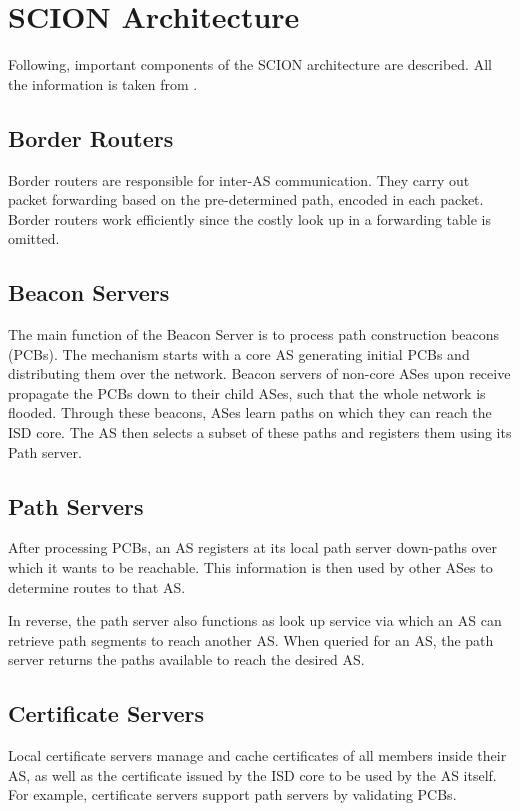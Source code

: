 \section{SCION Architecture}

Following, important components of the SCION architecture are described. All the information is taken from \cite{scion_book}.
 
\subsection{Border Routers}
Border routers are responsible for inter-AS communication. They carry out packet forwarding based on the pre-determined path, encoded in each packet. Border routers work efficiently since the costly look up in a forwarding table is omitted.

\subsection{Beacon Servers}
The main function of the Beacon Server is to process path construction beacons (PCBs). The mechanism starts with a core AS generating initial PCBs and distributing them over the network. Beacon servers of non-core ASes upon receive propagate the PCBs down to their child ASes, such that the whole network is flooded. Through these beacons, ASes learn paths on which they can reach the ISD core. The AS then selects a subset of these paths and registers them using its Path server.

\subsection{Path Servers}
After processing PCBs, an AS registers at its local path server down-paths over which it wants to be reachable. This information is then used by other ASes to determine routes to that AS.

In reverse, the path server also functions as look up service via which an AS can retrieve path segments to reach another AS. When queried for an AS, the path server returns the paths available to reach the desired AS.

\subsection{Certificate Servers}
Local certificate servers manage and cache certificates of all members inside their AS, as well as the certificate issued by the ISD core to be used by the AS itself. For example, certificate servers support path servers by validating PCBs. \cite[Chapter~2]{scion_book}

